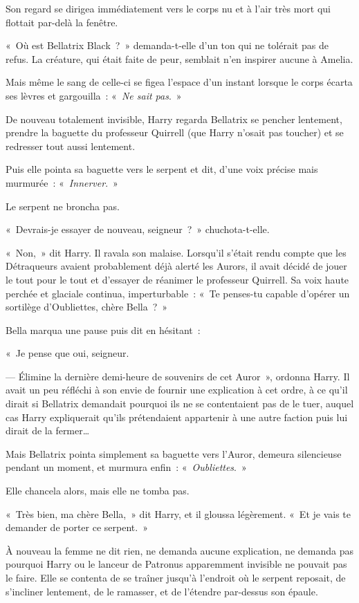 Son regard se dirigea immédiatement vers le corps nu et à l'air très mort qui flottait par-delà la fenêtre.

«~Où est Bellatrix Black~?~» demanda-t-elle d'un ton qui ne tolérait pas de refus. La créature, qui était faite de peur, semblait n'en inspirer aucune à Amelia.

Mais même le sang de celle-ci se figea l'espace d'un instant lorsque le corps écarta ses lèvres et gargouilla~: «~\emph{Ne sait pas}.~»

\later

De nouveau totalement invisible, Harry regarda Bellatrix se pencher lentement, prendre la baguette du professeur Quirrell (que Harry n'osait pas toucher) et se redresser tout aussi lentement.

Puis elle pointa sa baguette vers le serpent et dit, d'une voix précise mais murmurée~: «~\emph{Innerver}.~»

Le serpent ne broncha pas.

«~Devrais-je essayer de nouveau, seigneur~?~» chuchota-t-elle.

«~Non,~» dit Harry. Il ravala son malaise. Lorsqu'il s'était rendu compte que les Détraqueurs avaient probablement déjà alerté les Aurors, il avait décidé de jouer le tout pour le tout et d'essayer de réanimer le professeur Quirrell. Sa voix haute perchée et glaciale continua, imperturbable~: «~Te penses-tu capable d'opérer un sortilège d'Oubliettes, chère Bella~?~»

Bella marqua une pause puis dit en hésitant~:

«~Je pense que oui, seigneur.

--- Élimine la dernière demi-heure de souvenirs de cet Auror~», ordonna Harry. Il avait un peu réfléchi à son envie de fournir une explication à cet ordre, à ce qu'il dirait si Bellatrix demandait pourquoi ils ne se contentaient pas de le tuer, auquel cas Harry expliquerait qu'ils prétendaient appartenir à une autre faction puis lui dirait de la fermer…

Mais Bellatrix pointa simplement sa baguette vers l'Auror, demeura silencieuse pendant un moment, et murmura enfin~: «~\emph{Oubliettes}.~»

Elle chancela alors, mais elle ne tomba pas.

«~Très bien, ma chère Bella,~» dit Harry, et il gloussa légèrement. «~Et je vais te demander de porter ce serpent.~»

À nouveau la femme ne dit rien, ne demanda aucune explication, ne demanda pas pourquoi Harry ou le lanceur de Patronus apparemment invisible ne pouvait pas le faire. Elle se contenta de se traîner jusqu'à l'endroit où le serpent reposait, de s'incliner lentement, de le ramasser, et de l'étendre par-dessus son épaule.

